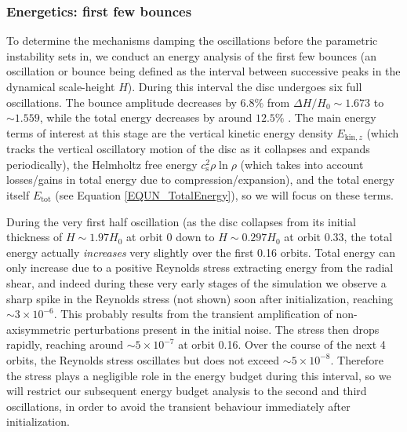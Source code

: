 \documentclass[fleqn,usenatbib]{mnras}
\begin{document}
\subsubsection{Energetics: first few bounces}
\label{SECTION_EnergeticsStronglyBouncingCase}
To determine the mechanisms damping the oscillations before the parametric instability sets in, we conduct an energy analysis of the first few bounces (an oscillation or bounce being defined as the interval between successive peaks in the dynamical scale-height $H$). During this interval the disc undergoes six full oscillations. The bounce amplitude %
decreases by $6.8\%$ from $\Delta H/H_0 \sim 1.673$ %
to $\sim 1.559$, %
while the total energy decreases by around $12.5\%$ %
. The main energy terms of interest at this stage are the vertical kinetic energy density $E_{\text{kin},z}$ (which tracks the vertical oscillatory motion of the disc as it collapses and expands periodically), the Helmholtz free energy $c_\text{s}^2 \rho \ln{\rho}$ (which takes into account losses/gains in total energy due to compression/expansion), and the total energy itself $E_\text{tot}$ (see Equation \ref{EQUN_TotalEnergy}), so we will focus on these terms.

During the very first half oscillation (as the disc collapses from its initial thickness of $H \sim 1.97H_0$ at orbit 0 down to $H \sim 0.297H_0$ at orbit 0.33, the total energy actually \textit{increases} very slightly over the first 0.16 orbits. Total energy can only increase due to a positive Reynolds stress %
extracting energy from the radial shear, and indeed during these very early stages of the simulation we observe a sharp spike in the Reynolds stress (not shown) soon after initialization, reaching $\sim3\times 10^{-6}$. This probably results from the transient amplification of non-axisymmetric perturbations present in the initial noise. The stress then drops rapidly, reaching around $\sim 5\times 10^{-7}$ at orbit 0.16. Over the course of the next 4 orbits, the Reynolds stress oscillates but does not exceed $\sim 5\times 10^{-8}$. Therefore the stress plays a negligible role in the energy budget during this interval, so we will restrict our subsequent energy budget analysis to the second and third oscillations, in order to avoid the transient behaviour immediately after initialization.
\end{document}
